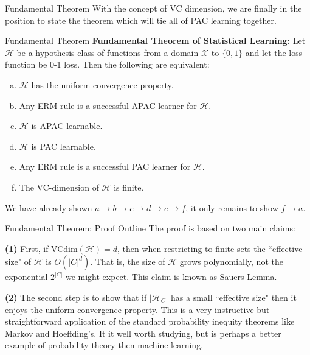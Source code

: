 \documentclass[10pt, table, dvipsnames, handout]{beamer}
\newcommand{\cX}{\ensuremath{\mathcal{X}}}
\newcommand{\cH}{\ensuremath{\mathcal{H}}}
\begin{document}
\begin{frame}[fragile]{Fundamental Theorem}
With the concept of VC dimension, we are finally in the position to state the theorem which will tie all of PAC learning together.
\end{frame}


\begin{frame}[fragile]{Fundamental Theorem}
\textbf{Fundamental Theorem of Statistical Learning:} Let $\cH$ be a hypothesis class of functions from a domain $\cX$ to $\{0,1\}$ and let the loss function be 0-1 loss. Then the following are equivalent:\pause
\begin{enumerate}[a)]
\item $\cH$ has the uniform convergence property. \pause
\item Any ERM rule is a successful APAC learner for $\cH$.\pause
\item $\cH$ is APAC learnable.\pause
\item $\cH$ is PAC learnable.\pause
\item Any ERM rule is a successful PAC learner for $\cH$.\pause
\item The VC-dimension of $\cH$ is finite. \pause
\end{enumerate}
We have already shown $a\to b\to c\to d\to e\to f$, it only remains to show $f\to a$. 
\end{frame}






\begin{frame}[fragile]{Fundamental Theorem: Proof Outline}
The proof is based on two main claims:\newline\pause

\textbf{(1)} First, if VCdim$(\cH) = d$, then when restricting to finite sets the ``effective size" of $\cH$ is $O(|C|^d)$. That is, the size of $\cH$ grows polynomially, not the exponential $2^{|C|}$ we might expect. This claim is known as Sauers Lemma.\pause\newline

\textbf{(2)} The second step is to show that if $|\cH_C|$ has a small ``effective size" then it enjoys the uniform convergence property. This is a very instructive but straightforward application of the standard probability inequity theorems like Markov and Hoeffding's. It it well worth studying, but is perhaps a better example of probability theory then machine learning. 
\end{frame}
\end{document}

